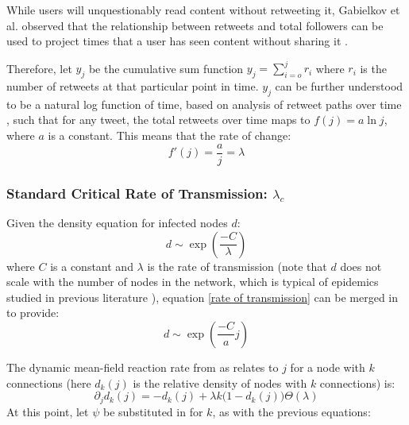 \documentclass[preprint,review,12pt]{elsarticle}
\begin{document}
While users will unquestionably read content without retweeting it, Gabielkov et al. observed that the relationship between retweets and total followers can be used to project times that a user has seen content without sharing it \cite{gabielkov2016social}.

Therefore, let $y_j$ be the cumulative sum function $y_j = \sum_{i=o}^j r_i$ where $r_i$ is the number of retweets at that particular point in time. $y_j$ can be further understood to be a natural log function of time, based on analysis of retweet paths over time \cite{gabielkov2016social,starbird2014rumors,mention2018twitter}, such that for any tweet, the total retweets over time maps to $f(j) = a \ln j$, where $a$ is a constant. This means that the rate of change:
\begin{equation}
    \label{rate of transmission}
    f'(j) = \frac{a}{j} = \lambda
\end{equation}

\subsubsection{Standard Critical Rate of Transmission: $\lambda_c$}

Given the density equation for infected nodes $d$: \begin{equation}
    \label{densityequation}
    d \sim \exp\left(\frac{ - C}{\lambda}\right)
\end{equation} where $C$ is a constant and $\lambda$ is the rate of transmission \citep{pastor2001epidemic} (note that $d$ does not scale with the number of nodes in the network, which is typical of epidemics studied in previous literature \citep{marro2005nonequilibrium}), equation \ref{rate of transmission}  can be merged in to provide:
\begin{equation}
    d \sim \exp\left(\frac{ - C}{a}j\right)
\end{equation}

The dynamic mean-field reaction rate from \citep{marro2005nonequilibrium,pastor2001dynamics,pastor2001epidemic} as relates to $j$ for a node with $k$ connections (here $d_k(j)$ is the relative density of nodes with $k$ connections) is: 
\begin{equation}
\label{dynamic mean-field reaction rate}
    \partial_jd_k(j) = - d_k(j) + \lambda k \big(1 - d_k(j)\big)\Theta(\lambda)
\end{equation}
At this point, let $\psi$ be substituted in for $k$, as with the previous equations:
\end{document}
